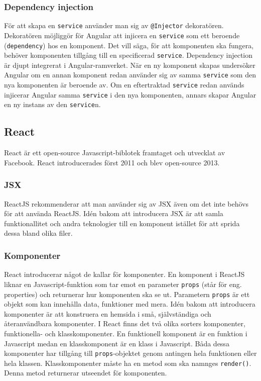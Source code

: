 
\subsubsection{Dependency injection}
För att skapa en \texttt{service} använder man sig av \texttt{@Injector} dekoratören. Dekoratören möjliggör för Angular att injicera en \texttt{service} som ett beroende (\texttt{dependency}) hos en komponent. Det vill säga, för att komponenten ska fungera, behöver komponenten tillgång till en specificerad \texttt{service}. Dependency injection är djupt integrerat i Angular-ramverket. När en ny komponent skapas undersöker Angular om en annan komponent redan använder sig av samma \texttt{service} som den nya komponenten är beroende av. Om en eftertraktad \texttt{service} redan används injicerar Angular samma \texttt{service} i den nya komponenten, annars skapar Angular en ny instans av den \texttt{service}n. \cite{angular-services}


\subsection{React}
React är ett open-source Javascript-biblotek framtaget och utvecklat av Facebook. React introducerades först 2011 och blev open-source 2013. \cite{react-date}


\subsubsection{JSX}
ReactJS rekommenderar att man använder sig av JSX även om det inte behövs för att använda ReactJS. Idén bakom att introducera JSX är att samla funktionallitet och andra teknologier till en komponent istället för att sprida dessa bland olika filer. \cite{react-jsx}


\subsubsection{Komponenter}
React introducerar något de kallar för komponenter. En komponent i ReactJS liknar en Javascript-funktion som tar emot en parameter \texttt{props} (står för eng. properties) och returnerar hur komponenten ska se ut. Parametern \texttt{props} är ett objekt som kan innehålla data, funktioner med mera. Idén bakom att introducera komponenter är att konstruera en hemsida i små, självständiga och återanvändbara komponenter. \cite{react-components} I React finns det två olika sorters komponenter, funktionella- och klasskomponenter. En funktionell komponent är en funktion i Javascript medan en klasskomponent är en klass i Javascript. Båda dessa komponenter har tillgång till \texttt{props}-objektet genom antingen hela funktionen eller hela klassen. Klasskomponenter måste ha en metod som ska namnges \texttt{render()}. Denna metod returnerar utseendet för komponenten.


